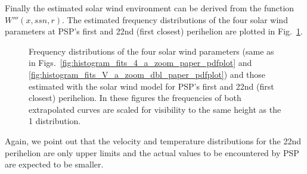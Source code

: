 Finally the estimated solar wind environment can be derived from the function $W'''(x,ssn,r)$. The estimated frequency distributions of the four solar wind parameters at PSP's first and 22nd (first closest) perihelion are plotted in Fig.~\ref{fig:SPP_sw_distributions_b}.
\begin{figure}
	\caption{Frequency distributions of the four solar wind parameters (same as in Figs.~\ref{fig:histogram_fits_4_a_zoom_paper_pdfplot} and \ref{fig:histogram_fits_V_a_zoom_dbl_paper_pdfplot}) and those estimated with the solar wind model for PSP's first and 22nd (first closest) perihelion. In these figures the frequencies of both extrapolated curves are scaled for visibility to the same height as the \SI{1}{\au} distribution.}
	\label{fig:SPP_sw_distributions_b}
\end{figure}
Again, we point out that the velocity and temperature distributions for the 22nd perihelion are only upper limits and the actual values to be encountered by PSP are expected to be smaller.


